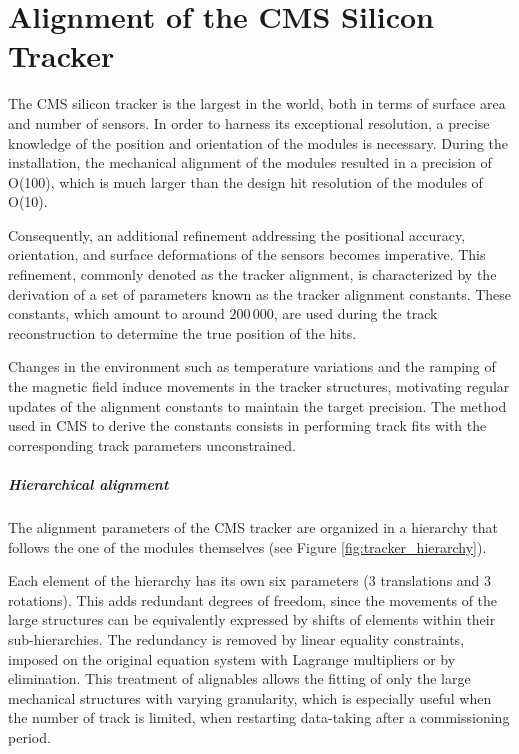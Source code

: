 \chapter{Alignment of the CMS Silicon Tracker}
\newcommand{\MPII}{\textsc{millepede}-II\xspace}
\newcommand{\HIPPY}{\textsc{HipPy}\xspace}
\newcommand{\MINRES}{\textsc{MinRes}\xspace}

The CMS silicon tracker is the largest in the world, both in terms of surface area and number of sensors.
In order to harness its exceptional resolution, a precise knowledge of the position and orientation of the modules is necessary.
During the installation, the mechanical alignment of the modules resulted in a precision of O(100\mum),
which is much larger than the design hit resolution of the modules of O(10\mum).

Consequently, an additional refinement addressing the positional accuracy, orientation, and surface deformations of the sensors becomes imperative.
This refinement, commonly denoted as the tracker alignment, is characterized by the derivation of a set of parameters known as the tracker alignment constants.
These constants, which amount to around $200\,000$, are used during the track reconstruction to determine the true position of the hits.

Changes in the environment such as temperature variations and the ramping of the magnetic field induce movements in the tracker structures,
motivating regular updates of the alignment constants to maintain the target precision.
The method used in CMS to derive the constants consists in performing track fits with the corresponding track parameters unconstrained.

\paragraph{Hierarchical alignment\\}
The alignment parameters of the CMS tracker are organized in a hierarchy that follows the one of the modules themselves (see Figure \ref{fig:tracker_hierarchy}).

Each element of the hierarchy has its own six parameters (3 translations and 3 rotations).
This adds redundant degrees of freedom, since the movements of the large structures can be equivalently expressed by shifts of elements within their sub-hierarchies.
The redundancy is removed by linear equality constraints,
imposed on the original equation system with Lagrange multipliers
or by elimination.
This treatment of alignables allows the fitting of only the large mechanical structures with varying granularity,
which is especially useful when the number of track is limited, \eg when restarting data-taking after a commissioning period.

